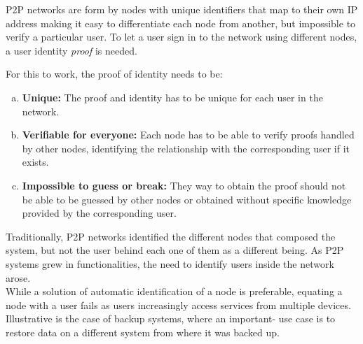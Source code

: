 P2P networks are form by nodes with unique identifiers that map to their
own IP address making it easy to differentiate each node from another, but
impossible to verify a particular user.
 To let a user sign in to the
network using different nodes, a user identity \textit{proof} is needed.


For this to work, the proof of identity needs to be:
\begin{enumerate}[a)]
  \item \textbf{Unique:} The proof and identity has to be unique for each user in the network.

  \item \textbf{Verifiable for everyone:}  Each node has to be able to verify proofs
    handled by other nodes, identifying the relationship with the corresponding user if it
    exists.
  \item \textbf{Impossible to guess or break:} They way to obtain the proof should not
    be able to be guessed by other nodes or obtained without specific knowledge
    provided by the corresponding user.
\end{enumerate}

Traditionally, P2P networks identified the different nodes that composed the
system, but not the user behind each one of them as a different being.
As P2P systems grew in functionalities, the need to identify users inside the
network arose.\\

While a solution of automatic identification of a node is preferable, equating a node with a user fails as users
increasingly access services from multiple devices.
Illustrative is the case of backup systems, where an important-
  use case is to restore data on a different system from where
it was backed up. \\

